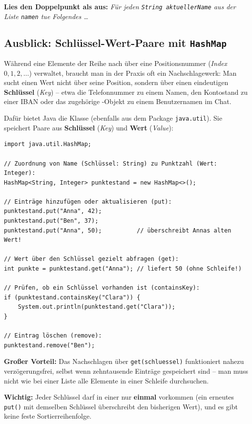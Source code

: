 \noindent \textbf{Lies den Doppelpunkt als \glqq aus\grqq :} \emph{\glqq Für
jeden \lstinline|String aktuellerName| aus der Liste \lstinline|namen| tue
Folgendes \ldots\grqq}


\subsection{Ausblick: Schlüssel-Wert-Paare mit \texttt{HashMap} \tagZusatz\tagLK}

Während eine  Elemente der Reihe nach über eine
Positionsnummer (\emph{Index} $0, 1, 2, \ldots$) verwaltet, braucht man in der
Praxis oft ein \glqq Nachschlagewerk\grqq : Man sucht einen Wert nicht über
seine Position, sondern über einen eindeutigen \textbf{Schlüssel} (\emph{Key})
-- etwa die Telefonnummer zu einem Namen, den Kontostand zu einer IBAN oder das
zugehörige -Objekt zu einem Benutzernamen im Chat.

Dafür bietet Java die Klasse  (ebenfalls aus dem Package
\texttt{java.util}). Sie speichert Paare aus \textbf{Schlüssel} (\emph{Key})
und \textbf{Wert} (\emph{Value}):

\begin{lstlisting}
import java.util.HashMap;

// Zuordnung von Name (Schlüssel: String) zu Punktzahl (Wert: Integer):
HashMap<String, Integer> punktestand = new HashMap<>();

// Einträge hinzufügen oder aktualisieren (put):
punktestand.put("Anna", 42);
punktestand.put("Ben", 37);
punktestand.put("Anna", 50);          // überschreibt Annas alten Wert!

// Wert über den Schlüssel gezielt abfragen (get):
int punkte = punktestand.get("Anna"); // liefert 50 (ohne Schleife!)

// Prüfen, ob ein Schlüssel vorhanden ist (containsKey):
if (punktestand.containsKey("Clara")) {
    System.out.println(punktestand.get("Clara"));
}

// Eintrag löschen (remove):
punktestand.remove("Ben");
\end{lstlisting}

\begin{compactitem}
  \item \textbf{Großer Vorteil:} Das Nachschlagen über \lstinline|get(schluessel)|
  funktioniert nahezu verzögerungsfrei, selbst wenn zehntausende Einträge
  gespeichert sind -- man muss nicht wie bei einer Liste alle Elemente in einer
  Schleife durchsuchen.
  \item \textbf{Wichtig:} Jeder Schlüssel darf in einer  nur
  \textbf{einmal} vorkommen (ein erneutes \lstinline|put()| mit demselben
  Schlüssel überschreibt den bisherigen Wert), und es gibt keine feste
  Sortierreihenfolge.
\end{compactitem}



